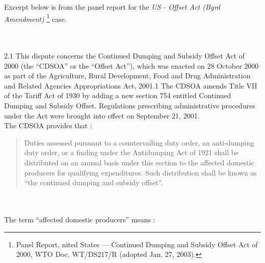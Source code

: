 Excerpt below is from the panel report for the 
\textit{US - Offset Act (Byrd Amendment)}
\footnote{Panel Report, nited States — Continued Dumping and Subsidy Offset Act of 2000, WTO Doc. WT/DS217/R (adopted Jan. 27, 2003).} case.\\

\begin{tcolorbox}[breakable]
\\\\
2.1 \quad This dispute concerns the Continued Dumping and Subsidy Offset Act of 2000 (the
“CDSOA” or the “Offset Act”), which was enacted on 28 October 2000 as part of the Agriculture,
Rural Development, Food and Drug Administration and Related Agencies Appropriations Act, 2001.1
The CDSOA amends Title VII of the Tariff Act of 1930 by adding a new section 754 entitled
Continued Dumping and Subsidy Offset. Regulations prescribing administrative procedures under the
Act were brought into effect on September 21, 2001.\\

 \quad The CDSOA provides that :

\blockquote{
    Duties assessed pursuant to a countervailing duty order, an anti-dumping duty order,
    or a finding under the Antidumping Act of 1921 shall be distributed on an annual
    basis under this section to the affected domestic producers for qualifying
    expenditures. Such distribution shall be known as “the continued dumping and
    subsidy offset”.
    }
\\\\
 \quad The term “affected domestic producers” means :


\end{tcolorbox}

